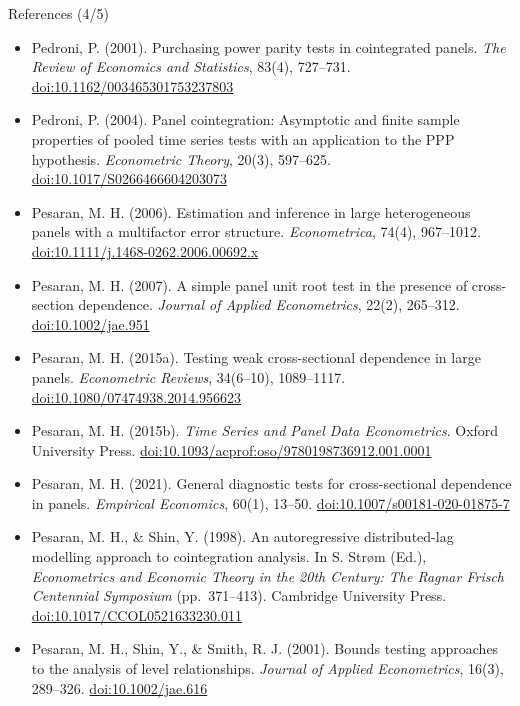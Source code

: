 \begin{frame}{References (4/5)}
\itemsize{\tiny}
\begin{itemize}
    \item Pedroni, P. (2001). Purchasing power parity tests in cointegrated panels. \textit{The Review of Economics and Statistics}, 83(4), 727--731. \href{https://doi.org/10.1162/003465301753237803}{doi:10.1162/003465301753237803}
    \item Pedroni, P. (2004). Panel cointegration: Asymptotic and finite sample properties of pooled time series tests with an application to the PPP hypothesis. \textit{Econometric Theory}, 20(3), 597--625. \href{https://doi.org/10.1017/S0266466604203073}{doi:10.1017/S0266466604203073}
    \item Pesaran, M. H. (2006). Estimation and inference in large heterogeneous panels with a multifactor error structure. \textit{Econometrica}, 74(4), 967--1012. \href{https://doi.org/10.1111/j.1468-0262.2006.00692.x}{doi:10.1111/j.1468-0262.2006.00692.x}
    \item Pesaran, M. H. (2007). A simple panel unit root test in the presence of cross-section dependence. \textit{Journal of Applied Econometrics}, 22(2), 265--312. \href{https://doi.org/10.1002/jae.951}{doi:10.1002/jae.951}
    \item Pesaran, M. H. (2015a). Testing weak cross-sectional dependence in large panels. \textit{Econometric Reviews}, 34(6--10), 1089--1117. \href{https://doi.org/10.1080/07474938.2014.956623}{doi:10.1080/07474938.2014.956623}
    \item Pesaran, M. H. (2015b). \textit{Time Series and Panel Data Econometrics}. Oxford University Press. \href{https://doi.org/10.1093/acprof:oso/9780198736912.001.0001}{doi:10.1093/acprof:oso/9780198736912.001.0001}
    \item Pesaran, M. H. (2021). General diagnostic tests for cross-sectional dependence in panels. \textit{Empirical Economics}, 60(1), 13--50. \href{https://doi.org/10.1007/s00181-020-01875-7}{doi:10.1007/s00181-020-01875-7}
    \item Pesaran, M. H., \& Shin, Y. (1998). An autoregressive distributed-lag modelling approach to cointegration analysis. In S. Strøm (Ed.), \textit{Econometrics and Economic Theory in the 20th Century: The Ragnar Frisch Centennial Symposium} (pp.\ 371--413). Cambridge University Press. \href{https://doi.org/10.1017/CCOL0521633230.011}{doi:10.1017/CCOL0521633230.011}
    \item Pesaran, M. H., Shin, Y., \& Smith, R. J. (2001). Bounds testing approaches to the analysis of level relationships. \textit{Journal of Applied Econometrics}, 16(3), 289--326. \href{https://doi.org/10.1002/jae.616}{doi:10.1002/jae.616}

\end{itemize}
\end{frame}
